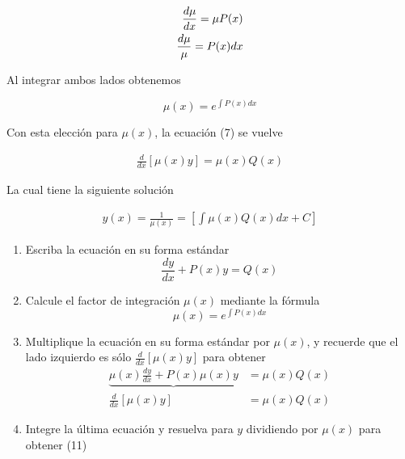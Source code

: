 \documentclass{article}
\begin{document}
\begin{align}
	\frac{d\mu}{dx} = \mu P(x) \nonumber \\
	\frac{d\mu}{\mu} = P(x)dx \noindent
\end{align}

\noindent Al integrar ambos lados obtenemos

\begin{tcolorbox}[colback=red!5!white,colframe=red!75!black,arc=0mm,boxrule=0mm,width=(\linewidth+0.5cm)]
	\begin{equation}
		\mu (x) = e^{\int{P(x)dx}}
	\end{equation}
\end{tcolorbox}

\noindent Con esta elección para $\mu (x)$, la ecuación (7) se vuelve

\begin{align}
	\frac{d}{dx}[\mu (x)y] = \mu (x)Q(x) \nonumber
\end{align}

\noindent La cual tiene la siguiente solución

\begin{align}
	y(x) = \frac{1}{\mu (x)} = \left[ \int \mu (x)Q(x) dx + C \right]
\end{align}

\begin{tcolorbox}[colback=red!5!white,colframe=red!75!black,arc=0mm,boxrule=0mm,width=(\linewidth+0.5cm),title=Método para resolver ecuaciones lineales,colbacktitle=red!60!white,coltitle=white]
	\begin{enumerate}[] 
		\item Escriba la ecuación en su forma estándar
		\begin{equation}
			\frac{dy}{dx} + P(x)y = Q(x) \nonumber
		\end{equation}
		\item Calcule el factor de integración $\mu(x)$ mediante la fórmula
		\begin{equation}
			\mu(x) = e^{\int P(x) dx} \nonumber
		\end{equation}
		\item Multiplique la ecuación en su forma estándar por $\mu(x)$, y recuerde que el lado izquierdo es sólo $\frac{d}{dx}[\mu(x)y]$ para obtener
		\begin{align}
			\underbrace{\mu(x)\frac{dy}{dx} + P(x)\mu(x)y } &= \mu(x)Q(x) \nonumber \\
			\frac{d}{dx}[\mu(x)y]  \qquad &= \mu(x)Q(x) \nonumber
		\end{align}
		\item Integre la última ecuación y resuelva para $y$ dividiendo por $\mu(x)$ para obtener (11)
	\end{enumerate}
\end{tcolorbox}
\end{document}
